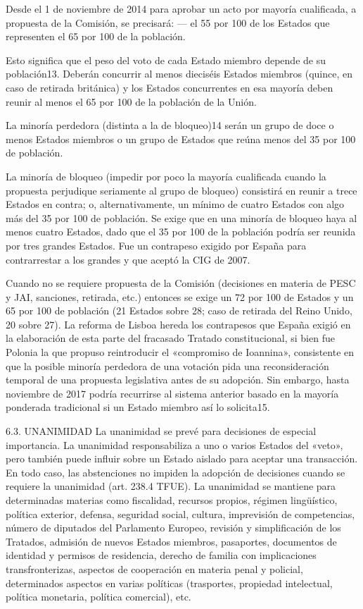 \documentclass[10pt,a4paper]{article}
\begin{document}
Desde el 1 de noviembre de 2014 para aprobar un acto por mayoría cualificada, a propuesta de la Comisión, se precisará:
— el 55 por 100 de los Estados que representen el 65 por 100 de la población.

Esto significa que el peso del voto de cada Estado miembro depende de su población13. Deberán concurrir al menos dieciséis Estados miembros (quince, en caso de retirada británica) y los Estados concurrentes en esa mayoría deben reunir al menos el 65 por 100 de la población de la Unión.

La minoría perdedora (distinta a la de bloqueo)14 serán un grupo de doce o menos Estados miembros o un grupo de Estados que reúna menos del 35 por 100 de población.

La minoría de bloqueo (impedir por poco la mayoría cualificada cuando la propuesta perjudique seriamente al grupo de bloqueo) consistirá en reunir a trece Estados en contra; o, alternativamente, un mínimo de cuatro Estados con algo más del 35 por 100 de población. Se exige que en una minoría de bloqueo haya al menos cuatro Estados, dado que el 35 por 100 de la población podría ser reunida por tres grandes Estados. Fue un contrapeso exigido por España para contrarrestar a los grandes y que aceptó la CIG de 2007.

Cuando no se requiere propuesta de la Comisión (decisiones en materia de PESC y JAI, sanciones, retirada, etc.) entonces se exige un 72 por 100 de Estados y un 65 por 100 de población (21 Estados sobre 28; caso de retirada del Reino Unido, 20 sobre 27). La reforma de Lisboa hereda los contrapesos que España exigió en la elaboración de esta parte del fracasado Tratado constitucional, si bien fue Polonia la que propuso reintroducir el «compromiso de Ioannina», consistente en que la posible minoría perdedora de una votación pida una reconsideración temporal de una propuesta legislativa antes de su adopción. Sin embargo, hasta noviembre de 2017 podría recurrirse al sistema anterior basado en la mayoría ponderada tradicional si un Estado miembro así lo solicita15.


6.3. UNANIMIDAD
La unanimidad se prevé para decisiones de especial importancia. La unanimidad responsabiliza a uno o varios Estados del «veto», pero también puede influir sobre un Estado aislado para aceptar una transacción. En todo caso, las abstenciones no impiden la adopción de decisiones cuando se requiere la unanimidad (art. 238.4 TFUE). La unanimidad se mantiene para determinadas materias como fiscalidad, recursos propios, régimen lingüístico, política exterior, defensa, seguridad social, cultura, imprevisión de competencias, número de diputados del Parlamento Europeo, revisión y simplificación de los Tratados, admisión de nuevos Estados miembros, pasaportes, documentos de identidad y permisos de residencia, derecho de familia con implicaciones transfronterizas, aspectos de cooperación en materia penal y policial, determinados aspectos en varias políticas (trasportes, propiedad intelectual, política monetaria, política comercial), etc. 
\end{document}
